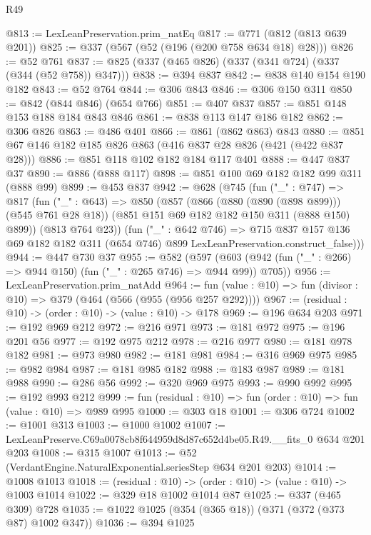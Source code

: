 \begin{lexlean}{R49}
\begin{coremodule}
@813 := LexLeanPreservation.prim_natEq
@817 := @771 (@812 (@813 @639 @201))
@825 := @337 (@567 (@52 (@196 (@200 @758 @634 @18) @28)))
@826 := @52 @761
@837 := @825 (@337 (@465 @826) (@337 (@341 @724) (@337 (@344 (@52 @758)) @347)))
@838 := @394 @837
@842 := @838 @140 @154 @190 @182
@843 := @52 @764
@844 := @306 @843
@846 := @306 @150 @311
@850 := @842 (@844 @846) (@654 @766)
@851 := @407 @837
@857 := @851 @148 @153 @188 @184 @843 @846
@861 := @838 @113 @147 @186 @182
@862 := @306 @826
@863 := @486 @401
@866 := @861 (@862 @863) @843
@880 := @851 @67 @146 @182 @185 @826 @863 (@416 @837 @28 @826 (@421 (@422 @837 @28)))
@886 := @851 @118 @102 @182 @184 @117 @401
@888 := @447 @837 @37
@890 := @886 (@888 @117)
@898 := @851 @100 @69 @182 @182 @99 @311 (@888 @99)
@899 := @453 @837
@942 := @628
    (@745
      (fun ("_" : @747) =>
      @817
        (fun ("_" : @643) =>
        @850
          (@857
            (@866 (@880 (@890 (@898 @899))) (@545 @761 @28 @18))
            (@851 @151 @69 @182 @182 @150 @311 (@888 @150) @899))
          (@813 @764 @23))
        (fun ("_" : @642 @746) =>
        @715
          @837
          @157
          @136
          @69
          @182
          @182
          @311
          (@654 @746)
          @899
          LexLeanPreservation.construct_false)))
@944 := @447 @730 @37
@955 := @582
    (@597 (@603 (@942 (fun ("_" : @266) => @944 @150) (fun ("_" : @265 @746) => @944 @99)) @705))
@956 := LexLeanPreservation.prim_natAdd
@964 := fun (value : @10) => fun (divisor : @10) => @379 (@464 (@566 (@955 (@956 @257 @292))))
@967 := (residual : @10) -> (order : @10) -> (value : @10) -> @178
@969 := @196 @634 @203
@971 := @192 @969 @212
@972 := @216 @971
@973 := @181 @972
@975 := @196 @201 @56
@977 := @192 @975 @212
@978 := @216 @977
@980 := @181 @978 @182
@981 := @973 @980
@982 := @181 @981
@984 := @316 @969 @975
@985 := @982 @984
@987 := @181 @985 @182
@988 := @183 @987
@989 := @181 @988
@990 := @286 @56
@992 := @320 @969 @975
@993 := @990 @992
@995 := @192 @993 @212
@999 := fun (residual : @10) => fun (order : @10) => fun (value : @10) => @989 @995
@1000 := @303 @18
@1001 := @306 @724
@1002 := @1001 @313
@1003 := @1000 @1002
@1007 := LexLeanPreserve.C69a0078cb8f644959d8d87c652d4be05.R49.__fits_0 @634 @201 @203
@1008 := @315 @1007
@1013 := @52 (VerdantEngine.NaturalExponential.seriesStep @634 @201 @203)
@1014 := @1008 @1013
@1018 := (residual : @10) -> (order : @10) -> (value : @10) -> @1003 @1014
@1022 := @329 @18 @1002 @1014 @87
@1025 := @337 (@465 @309) @728
@1035 := @1022 @1025 (@354 (@365 @18)) (@371 (@372 (@373 @87) @1002 @347))
@1036 := @394 @1025

\end{coremodule}
\end{lexlean}
